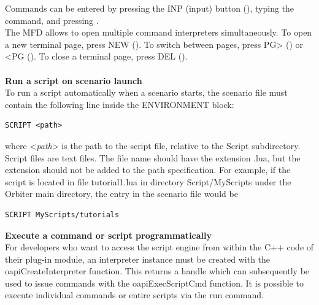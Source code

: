 \documentclass[Orbiter User Manual.tex]{subfiles}
\begin{document}
Commands can be entered by pressing the INP (input) button (\Shift{}), typing the command, and pressing \Enter.\\
The MFD allows to open multiple command interpreters simultaneously. To open a new terminal page, press NEW (\Shift{}). To switch between pages, press PG> (\Shift{}) or <PG (\Shift\keystroke{,}). To close a terminal page, press DEL (\Shift{}).\\
\\
\textbf{Run a script on scenario launch}\\
To run a script automatically when a scenario starts, the scenario file must contain the following line inside the ENVIRONMENT block:

\begin{lstlisting}[language=OSFS]
SCRIPT <path>
\end{lstlisting}

\noindent
where <\textit{path}> is the path to the script file, relative to the Script subdirectory. Script files are text files. The file name should have the extension .lua, but the extension should not be added to the path specification. For example, if the script is located in file tutorial1.lua in directory Script/MyScripts under the Orbiter main directory, the entry in the scenario file would be

\begin{lstlisting}[language=OSFS]
SCRIPT MyScripts/tutorials
\end{lstlisting}

\noindent
\textbf{Execute a command or script programmatically}\\
For developers who want to access the script engine from within the C++ code of their plug-in module, an interpreter instance must be created with the oapiCreateInterpreter function. This returns a handle which can subsequently be used to issue commands with the oapiExecScriptCmd function. It is possible to execute individual commands or entire scripts via the run command.
\end{document}
